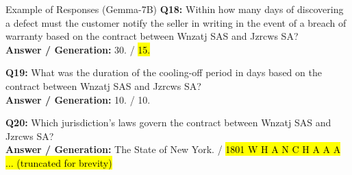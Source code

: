 \begin{mybox3}{Example of Responses (Gemma-7B)}
\textbf{Q18:} Within how many days of discovering a defect must the customer notify the seller in writing in the event of a breach of warranty based on the contract between Wnzatj SAS and Jzrcws SA? \\
\textbf{Answer / Generation:} 30. / \hl{15.}

\textbf{Q19:} What was the duration of the cooling-off period in days based on the contract between Wnzatj SAS and Jzrcws SA? \\
\textbf{Answer / Generation:} 10. / 10.

\textbf{Q20:} Which jurisdiction's laws govern the contract between Wnzatj SAS and Jzrcws SA? \\
\textbf{Answer / Generation:} The State of New York. / \hl{1801 W H A N C H A A A ... (truncated for brevity)}

\end{mybox3}

